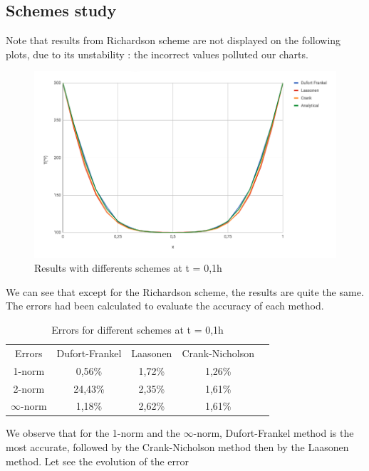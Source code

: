 \documentclass{article}
\begin{document}
        \subsection{Schemes study}
            Note that results from Richardson scheme are not displayed on the following plots, due to its unstability : 
        the incorrect values polluted our charts.
        \begin{figure}[H]
            \includegraphics[width=\textwidth]{t01.png}
            \caption{Results with differents schemes at t = 0,1h}
        \end{figure}
        We can see that except for the Richardson scheme, the results are quite the same. The errors had been calculated 
        to evaluate the accuracy of each method.
        \begin{table}[H]
            \centering
            \caption{Errors for different schemes at t = 0,1h}
            \begin{tabular}{|c|c|c|c|l}
            \cline{1-4}
            Errors & Dufort-Frankel & Laasonen & Crank-Nicholson &  \\ \cline{1-4}
            1-norm & 0,56\%         & 1,72\%   & 1,26\%          &  \\ \cline{1-4}
            2-norm & 24,43\%        & 2,35\%   & 1,61\%          &  \\ \cline{1-4}
            $\infty$-norm  & 1,18\%         & 2,62\%   & 1,61\%          &  \\ \cline{1-4}
            \end{tabular}
        \end{table}
        We observe that for the 1-norm and the $\infty$-norm, Dufort-Frankel method is the most accurate, 
        followed by the Crank-Nicholson method then by the Laasonen method. Let see the evolution of the error
\end{document}
